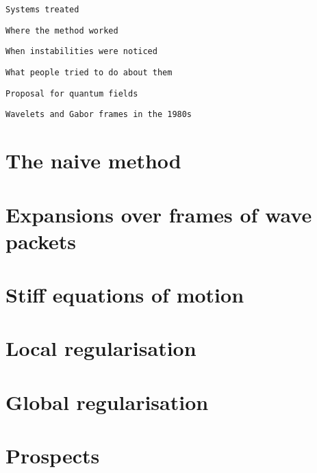 \documentclass[aip,jcp,graphicx,draft]{revtex4-1}
\begin{document}
{\tt Systems treated}

{\tt Where the method worked}

{\tt When instabilities were noticed}

{\tt What people tried to do about them}

{\tt Proposal for quantum fields}

{\tt Wavelets and Gabor frames in the 1980s}

\section{The naive method}

\section{Expansions over frames of wave packets}

\section{Stiff equations of motion}

\section{Local regularisation}

\section{Global regularisation}

\section{Prospects}

\subsection{}
\subsubsection{}


%
%
\end{document}
